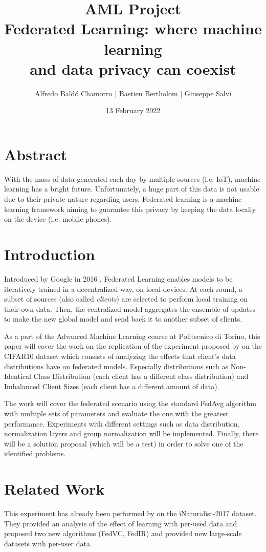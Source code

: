 \documentclass[twocolumn]{article}
\title{\textbf{AML Project}
\\Federated Learning: where machine learning \\and data privacy can coexist
}
\author{
Alfredo Baldó Chamorro | 
Bastien Bertholom |
Giuseppe Salvi
}
\date{13 February 2022}
\begin{document}
\maketitle

\section{Abstract}
With the mass of data generated each day by multiple sources (i.e. IoT), machine learning has a bright future. Unfortunately, a huge part of this data is not usable due to their private nature regarding users. Federated learning is a machine learning framework aiming to guarantee this privacy by keeping the data locally on the device (i.e. mobile phones).
\section{Introduction} %

Introduced by Google in 2016 \cite{DBLP:journals/corr/KonecnyMYRSB16}, Federated Learning enables models to be iteratively trained in a decentralized way, on local devices. At each round, a subset of sources (also called \emph{clients}) are selected to perform local training on their own data. Then, the centralized model aggregates the ensemble of updates to make the new global model and send back it to another subset of clients. 

As a part of the Advanced Machine Learning course at Politecnico di Torino, this paper will cover the work on the replication of the experiment proposed by \cite{DBLP:journals/corr/abs-2003-08082} on the CIFAR10 dataset which consists of analyzing the effects that client's data distributions have on federated models. Especially distributions such as Non-Identical Class Distribution (each client has a different class distribution) and Imbalanced Client Sizes (each client has a different amount of data). 

The work will cover the federated scenario using the standard FedAvg algorithm with multiple sets of parameters and evaluate the one with the greatest performance. Experiments with different settings such as data distribution, normalization layers and group normalization will be implemented. Finally, there will be a solution proposal (which will be a test) in order to solve one of the identified problems.

\section{Related Work} %
This experiment has already been performed by \cite{DBLP:journals/corr/abs-2003-08082}  on the iNaturalist-2017 dataset. They provided an analysis of the effect of learning with per-used data and proposed two new algorithms (FedVC, FedIR) and provided new large-scale datasets with per-user data.
\end{document}

